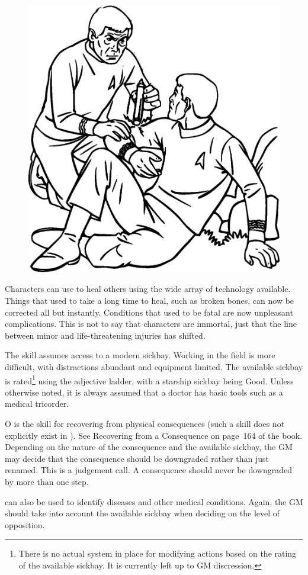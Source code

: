 \documentclass[12pt,titlepage,openany]{book}
\begin{document}
\begin{figure}
    \centering
    \includegraphics[width=0.8\linewidth]{img/Medicine.eps}\\
\end{figure}

Characters can use  to heal others using the wide array of
technology available. Things that used to take a long time to heal, such as
broken bones, can now be corrected all but instantly. Conditions that used to
be fatal are now unpleasant complications. This is not to say that characters
are immortal, just that the line between minor and life-threatening injuries
has shifted.

The  skill assumes access to a modern sickbay. Working in the
field is more difficult, with distractions abundant and equipment limited. The
available sickbay is rated\footnote{There is no actual system in place for
modifying  actions based on the rating of the available
sickbay. It is currently left up to GM discression.} using the adjective
ladder, with a starship sickbay being Good. Unless otherwise noted, it is
always assumed that a doctor has basic tools such as a medical tricorder.

\vspace{1ex}

\begin{NewSkillAction}{O}
     is the skill for recovering from physical consequences
    (such a skill does not explicitly exist in \FateCore{}). See Recovering
    from a Consequence on page~164 of the \FateCore{} book. Depending on the
    nature of the consequence and the available sickbay, the GM may decide that
    the consequence should be downgraded rather than just renamed. This is a
    judgement call. A consequence should never be downgraded by more than one
    step.

     can also be used to identify diseases and other medical
    conditions. Again, the GM should take into account the available sickbay
    when deciding on the level of opposition.
\end{NewSkillAction}
\end{document}
